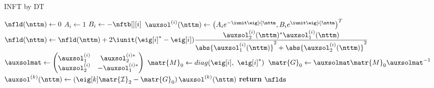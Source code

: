 \begin{algorithm}[t]
    \caption{\acl{INFT} by \acl{DT}}\label{euclid}
    \begin{algorithmic}[1]
        \State $\nfld(\nttm) \gets 0$ 
        \State $A_i \gets 1$
        \State $B_i \gets -\nftb[][i]$
        \State $\auxsol^{(i)}(\nttm) \gets \left(
                        A_i e^{- \iunit \eig[i] \nttm},
                        B_i e^{ \iunit \eig[i] \nttm} \right)^T$
        \EndFor
        \State $\nfld(\nttm) \gets \nfld(\nttm)+2\iunit(\eig[i]^*-\eig[i])
        \dfrac{\auxsol_2^{(i)}(\nttm)^*\auxsol_1^{(i)}(\nttm)}{\abs{\auxsol_1^{(i)}(\nttm)}^2 + \abs{\auxsol_2^{(i)}(\nttm)}^2}$
        \State $\auxsolmat \gets \begin{pmatrix}
            \auxsol_1^{(i)} & \auxsol_2^{(i)*} \\
            \auxsol_2^{(i)} & -\auxsol_1^{(i)*}
            \end{pmatrix}$
        \State $\matr{M}_0 \gets diag(\eig[i],~\eig[i]^*)$
        \State $\matr{G}_{0} \gets \auxsolmat \matr{M}_{0}\auxsolmat^{-1}$
        \State $\auxsol^{(k)}(\nttm) \gets\left(\eig[k] \mathcal{\matr{I}}_2-\matr{G}_{0}\right)\auxsol^{(k)}(\nttm)$
        \EndFor
        \EndFor
        \State \textbf{return} $\nflds$
        \EndProcedure
    \end{algorithmic}
    \label{alg:darboux_transform}
\end{algorithm}
